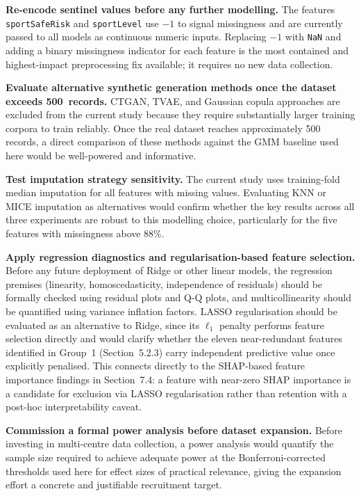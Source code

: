 \documentclass[11pt,a4paper]{report}
\begin{document}
\textbf{Re-encode sentinel values before any further modelling.} The features
\texttt{sportSafeRisk} and \texttt{sportLevel} use $-1$ to signal missingness and are currently
passed to all models as continuous numeric inputs. Replacing $-1$ with \texttt{NaN} and adding a
binary missingness indicator for each feature is the most contained and highest-impact
preprocessing fix available; it requires no new data collection.

\textbf{Evaluate alternative synthetic generation methods once the dataset exceeds 500~records.}
CTGAN, TVAE, and Gaussian copula approaches are excluded from the current study because they
require substantially larger training corpora to train reliably. Once the real dataset reaches
approximately 500 records, a direct comparison of these methods against the GMM baseline used here
would be well-powered and informative.

\textbf{Test imputation strategy sensitivity.} The current study uses training-fold median
imputation for all features with missing values. Evaluating KNN or MICE imputation as alternatives
would confirm whether the key results across all three experiments are robust to this modelling
choice, particularly for the five features with missingness above 88\%.

\textbf{Apply regression diagnostics and regularisation-based feature selection.} Before any
future deployment of Ridge or other linear models, the regression premises (linearity,
homoscedasticity, independence of residuals) should be formally checked using residual plots and
Q-Q plots, and multicollinearity should be quantified using variance inflation factors. LASSO
regularisation should be evaluated as an alternative to Ridge, since its $\ell_1$ penalty performs
feature selection directly and would clarify whether the eleven near-redundant features identified
in Group~1 (Section~5.2.3) carry independent predictive value once explicitly penalised. This
connects directly to the SHAP-based feature importance findings in Section~7.4: a feature with
near-zero SHAP importance is a candidate for exclusion via LASSO regularisation rather than
retention with a post-hoc interpretability caveat.

\textbf{Commission a formal power analysis before dataset expansion.} Before investing in
multi-centre data collection, a power analysis would quantify the sample size required to achieve
adequate power at the Bonferroni-corrected thresholds used here for effect sizes of practical
relevance, giving the expansion effort a concrete and justifiable recruitment target.
\end{document}
